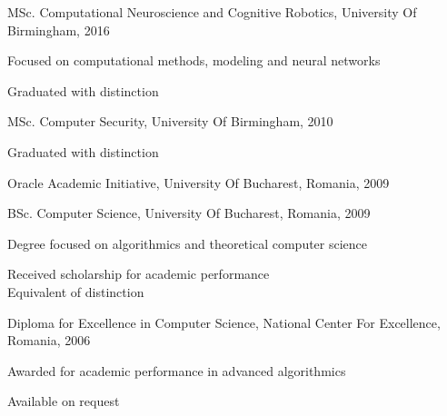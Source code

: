 \documentclass[11pt,article,oneside]{memoir}
\begin{document}
\ind MSc. Computational Neuroscience and Cognitive Robotics, University Of Birmingham, \hfill 2016

\ind \hspace{0.35in} \footnotesize Focused on computational methods, modeling and neural networks \normalsize

\ind \hspace{0.35in} \footnotesize Graduated with distinction \normalsize

\ind MSc. Computer Security, University Of Birmingham, \hfill 2010

\ind \hspace{0.35in} \footnotesize Graduated with distinction \normalsize

\ind Oracle Academic Initiative, University Of Bucharest, Romania, \hfill 2009

\ind BSc. Computer Science, University Of Bucharest, Romania, \hfill 2009

\ind \hspace{0.35in} \footnotesize Degree focused on algorithmics and theoretical computer science\normalsize

\ind \hspace{0.35in} \footnotesize Received scholarship for academic performance \\ Equivalent of distinction \normalsize

\ind Diploma for Excellence in Computer Science, National Center For Excellence, Romania, \hfill 2006

\ind \hspace{0.35in} \footnotesize Awarded for academic performance in advanced algorithmics \normalsize

\normalsize
\bigskip
{}

\ind Available on request
\end{document}
